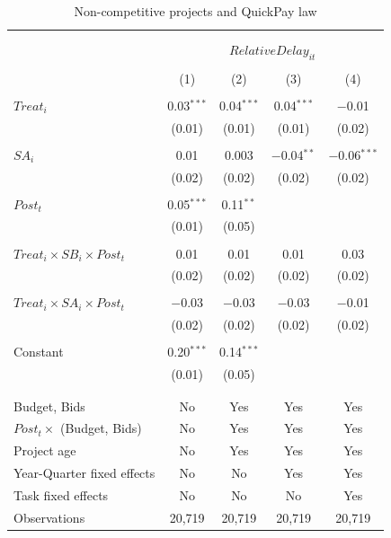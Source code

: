 \documentclass[
]{article}
\begin{document}
\begin{table}[H] \centering 
  \caption{Non-competitive projects and QuickPay law} 
  \label{} 
\small 
\begin{tabular}{@{\extracolsep{-2pt}}lcccc} 
\\[-1.8ex]\hline 
\hline \\[-1.8ex] 
\\[-1.8ex] & \multicolumn{4}{c}{$RelativeDelay_{it}$} \\ 
\\[-1.8ex] & (1) & (2) & (3) & (4)\\ 
\hline \\[-1.8ex] 
 $Treat_i$ & 0.03$^{***}$ & 0.04$^{***}$ & 0.04$^{***}$ & $-$0.01 \\ 
  & (0.01) & (0.01) & (0.01) & (0.02) \\ 
  & & & & \\ 
 $SA_i$ & 0.01 & 0.003 & $-$0.04$^{**}$ & $-$0.06$^{***}$ \\ 
  & (0.02) & (0.02) & (0.02) & (0.02) \\ 
  & & & & \\ 
 $Post_t$ & 0.05$^{***}$ & 0.11$^{**}$ &  &  \\ 
  & (0.01) & (0.05) &  &  \\ 
  & & & & \\ 
 $Treat_i \times SB_i \times Post_t$ & 0.01 & 0.01 & 0.01 & 0.03 \\ 
  & (0.02) & (0.02) & (0.02) & (0.02) \\ 
  & & & & \\ 
 $Treat_i \times SA_i \times Post_t$ & $-$0.03 & $-$0.03 & $-$0.03 & $-$0.01 \\ 
  & (0.02) & (0.02) & (0.02) & (0.02) \\ 
  & & & & \\ 
 Constant & 0.20$^{***}$ & 0.14$^{***}$ &  &  \\ 
  & (0.01) & (0.05) &  &  \\ 
  & & & & \\ 
\hline \\[-1.8ex] 
Budget, Bids & No & Yes & Yes & Yes \\ 
$Post_t \times $  (Budget, Bids) & No & Yes & Yes & Yes \\ 
Project age & No & Yes & Yes & Yes \\ 
Year-Quarter fixed effects & No & No & Yes & Yes \\ 
Task fixed effects & No & No & No & Yes \\ 
Observations & 20,719 & 20,719 & 20,719 & 20,719 \\ 

\end{tabular}
\end{table}
\end{document}
